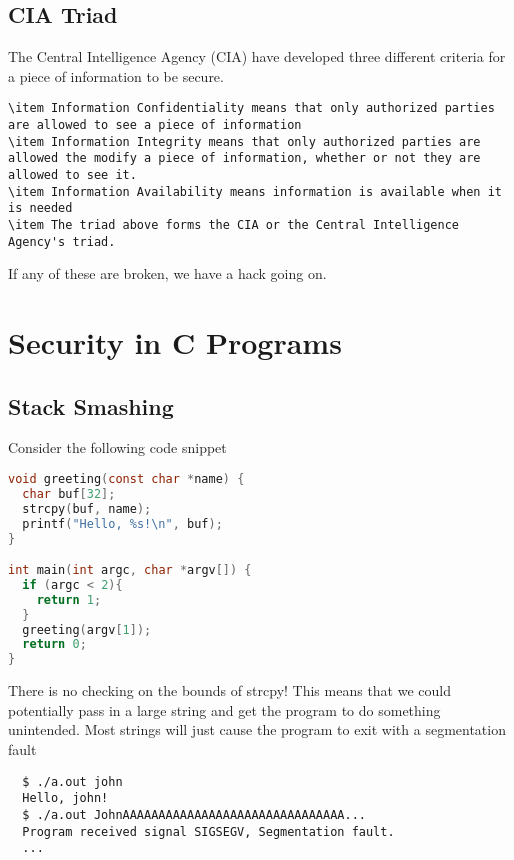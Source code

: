 
\subsection{CIA Triad}

The Central Intelligence Agency (CIA) have developed three different criteria for a piece of information to be secure.

\begin{lstlisting}
\item Information Confidentiality means that only authorized parties are allowed to see a piece of information
\item Information Integrity means that only authorized parties are allowed the modify a piece of information, whether or not they are allowed to see it.
\item Information Availability means information is available when it is needed
\item The triad above forms the CIA or the Central Intelligence Agency's triad.
\end{lstlisting}

If any of these are broken, we have a hack going on.

\section{Security in C Programs}

\subsection{Stack Smashing}

Consider the following code snippet

\begin{lstlisting}[language=C]
void greeting(const char *name) {
  char buf[32];
  strcpy(buf, name);
  printf("Hello, %s!\n", buf);
}

int main(int argc, char *argv[]) {
  if (argc < 2){
    return 1;
  }
  greeting(argv[1]);
  return 0;
}
\end{lstlisting}

There is no checking on the bounds of strcpy!
This means that we could potentially pass in a large string and get the program to do something unintended.
Most strings will just cause the program to exit with a segmentation fault

\begin{lstlisting}
  $ ./a.out john
  Hello, john!
  $ ./a.out JohnAAAAAAAAAAAAAAAAAAAAAAAAAAAAAAA...
  Program received signal SIGSEGV, Segmentation fault.
  ...
\end{lstlisting}

